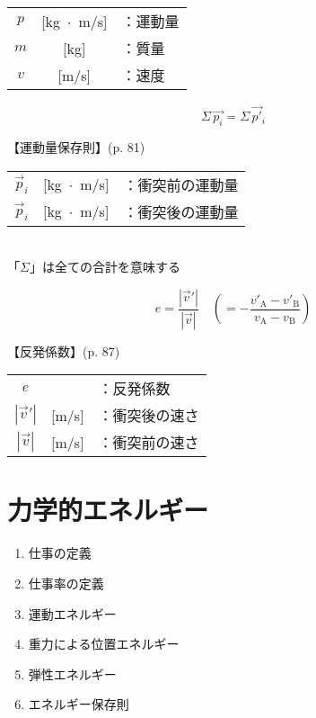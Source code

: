 \documentclass[10pt]{jarticle}
\begin{document}
\begin{tabular}{ccl}
$p$	&[kg $\!\! \cdot \!\!$ m/s]	&：運動量\\
$m$	&[kg]	&：質量\\
$v$	&[m/s]	&：速度
\end{tabular}






\newpage
\[
	\Sigma \, \vec{p_i} = \Sigma \, \vec{p'}\!_i
\]

\vskip3mm
【運動量保存則】{\footnotesize (p. 81)}

\begin{tabular}{ccl}
$\vec{p}_i$	&[kg $\!\! \cdot \!\!$ m/s]	&：衝突前の運動量\\
$\vec{p}_i$	&[kg $\!\! \cdot \!\!$ m/s]	&：衝突後の運動量
\end{tabular}
\\

{「$\Sigma$」は全ての合計を意味する}





\newpage
\[
  e = \frac{|\vec{v}'|}{|\vec{v}|} \quad \left( = - \frac{v'_\mathrm{A} - v'_\mathrm{B}}{v_\mathrm{A} - v_\mathrm{B}} \right)
\]


\vskip3mm
【反発係数】{\footnotesize (p. 87)}

\begin{tabular}{ccl}
$e$	&	&：反発係数\\
$|\vec{v}'|$	&[m/s]	&：衝突後の速さ\\
$|\vec{v}|$	&[m/s]	&：衝突前の速さ
\end{tabular}





\newpage
\addtocounter{page}{-1}
\thispagestyle{empty}
\section{力学的エネルギー}

\begin{enumerate}
\setcounter{enumi}{\thepage}
\small
\itemsep-4mm
\item 仕事の定義\\
\item 仕事率の定義\\
\item 運動エネルギー\\
\item 重力による位置エネルギー\\
\item 弾性エネルギー\\
\item エネルギー保存則
\end{enumerate}
\end{document}
